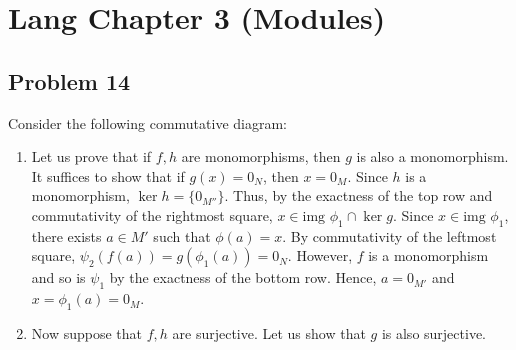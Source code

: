 \documentclass[Lang.tex]{subfiles}
\begin{document}
\section*{Lang Chapter 3 (Modules)}

\subsection{Problem 14}

Consider the following commutative diagram:


	\begin{enumerate}
		\item Let us prove that if $f,h$ are monomorphisms, then $g$ is also a monomorphism. 
		It suffices to show that if $g(x) = 0_N$, then $x = 0_M$. 
		Since $h$ is a monomorphism, $\ker h = \{0_{M''}\}$. Thus, by the exactness of the top row and commutativity of the rightmost square, $x \in \text{img }\phi_1 \cap \ker{g}$. Since $x \in \text{img }\phi_1$, there exists $a \in M'$ such that $\phi(a) = x$. By commutativity of the leftmost square, $\psi_2(f(a)) = g(\phi_1(a)) = 0_N$. However, $f$ is a monomorphism and so is $\psi_1$ by the exactness of the bottom row. Hence, $a = 0_{M'}$ and $x = \phi_1(a) = 0_M$.
		\item Now suppose that $f,h$ are surjective. Let us show that $g$ is also surjective. 
	\end{enumerate}

	
\end{document}
